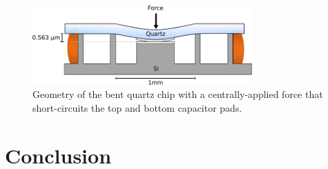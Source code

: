 \documentclass[double,12pt,1in,seploa]{beavtex}
\let\Oldsection\section
\renewcommand{\section}{\FloatBarrier\Oldsection}
\begin{document}
\begin{figure}
    \includegraphics[width = 0.75\textwidth]{quartz bending.pdf}
    \caption{Geometry of the bent quartz chip with a centrally-applied force that short-circuits the top and bottom capacitor pads.}
    \label{quartz bending}
\end{figure}


\section{Conclusion}
\end{document}
